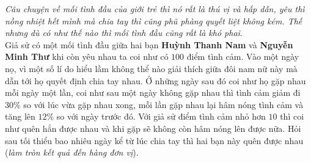 \begin{ex}%
	\textit{Câu chuyện về mối tình đầu của giới trẻ thì nó rất là thú vị và hấp dẫn, yêu thì nồng nhiệt hết mình mà chia tay thì cũng phũ phàng quyết liệt không kém. Thế nhưng dù có như thế nào thì mối tình đầu cũng rất là khó phai}. \\
	Giả sử có một mối tình đầu giữa hai bạn \textbf{Huỳnh Thanh Nam} và \textbf{Nguyễn Minh Thư} khi còn yêu nhau ta coi như có $100$ điểm tình cảm. Vào một ngày nọ, vì một số lí do hiểu lầm không thể nào giải thích giữa đôi nam nữ này mà dẫn tới họ quyết định chia tay nhau. Ở những ngày sau đó coi như họ gặp nhau mỗi ngày một lần, coi như sau một ngày không gặp nhau thì tình cảm giảm đi $30\%$ so với lúc vừa gặp nhau xong, mỗi lần gặp nhau lại hâm nóng tình cảm và tăng lên $12\%$ so với ngày trước đó. Với giả sử điểm tình cảm nhỏ hơn $10$ thì coi như quên hẳn được nhau và khi gặp sẽ không còn hâm nóng lên được nữa. Hỏi sau tối thiểu bao nhiêu ngày kể từ lúc chia tay thì hai bạn này quên được nhau (\textit{làm tròn kết quả đến hàng đơn vị}).
	\par
\end{ex}

